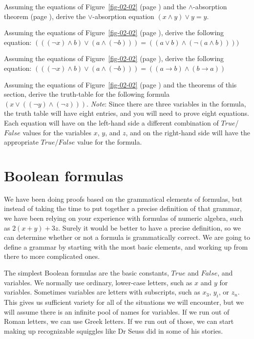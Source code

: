 \begin{ExerciseList}
\Exercise
Assuming the equations of Figure~\ref{fig-02-02} (page \pageref{fig-02-02})
and the $\wedge$-absorption theorem (page \pageref{and-absorption-thm}),
derive the $\vee$-absorption equation $(x \wedge y) \vee y = y$.

\Exercise
Assuming the equations of Figure~\ref{fig-02-02} (page \pageref{fig-02-02}),
derive the following equation:
$(((\neg x) \wedge b) \vee (a \wedge (\neg b))) = ((a \vee b) \wedge (\neg(a \wedge b))))$

\Exercise
Assuming the equations of Figure~\ref{fig-02-02} (page \pageref{fig-02-02}),
derive the following equation:
$(((\neg x) \wedge b) \vee (a \wedge (\neg b))) = ((a \rightarrow b) \wedge (b \rightarrow a))$

\Exercise
Assuming the equations of Figure~\ref{fig-02-02} (page \pageref{fig-02-02})
and the theorems of this section,
derive the truth-table for the following formula $(x \vee ((\neg y) \wedge (\neg z)))$.
\emph{Note}: Since there are three variables in the formula, the truth table
will have eight entries, and you will need to prove eight equations.
Each equation will have on the left-hand side
a different combination of $True$/$False$ values for the variables $x$, $y$, and $z$,
and on the right-hand side will have the appropriate $True$/$False$ value for the formula.
\end{ExerciseList}

\section{Boolean formulas}
\label{sec:boolean-formuas}

We have been doing proofs based on the grammatical elements of formulas, but instead of taking the time to put together a precise definition of that grammar, we have been relying on your experience with formulas of numeric algebra, such as $2(x + y) + 3z$. Surely it would be better to have a precise definition, so we can determine whether or not a formula is grammatically correct. We are going to define a grammar by starting with the most basic elements, and working up from there to more complicated ones.

The simplest Boolean formulas are the basic constants, $True$ and $False$, and variables. We normally use ordinary, lower-case letters, such as $x$ and $y$ for variables. Sometimes variables are letters with subscripts, such as $x_3$, $y_i$, or $z_n$. This gives us sufficient variety for all of the situations we will encounter, but we will assume there is an infinite pool of names for variables. If we run out of Roman letters, we can use Greek letters. If we run out of those, we can start making up recognizable squiggles like Dr Seuss did in some of his stories.

